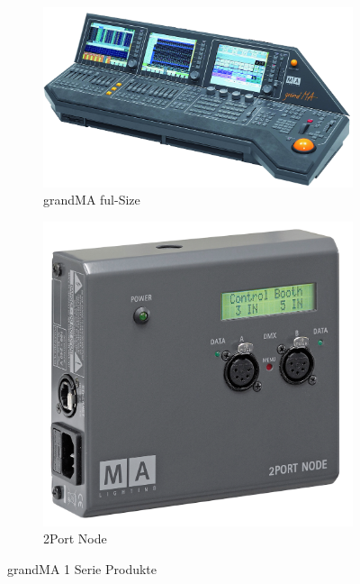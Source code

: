 \documentclass[11pt]{scrartcl}
\begin{document}
\begin{figure}[H]
    \centering
    \begin{subfigure}[b]{0.45\textwidth}
        \includegraphics[width=\textwidth]{images/grandMA_1.png}
        \caption{grandMA ful-Size}
    \end{subfigure}
    \hfill 
    \begin{subfigure}[b]{0.25\textwidth}
        \includegraphics[width=\textwidth]{images/MA_2Port_Node_onPC_13019x.png}
        \caption{2Port Node}
    \end{subfigure}
    \caption{grandMA 1 Serie Produkte}\label{fig:gma1}
\end{figure}
\end{document}
